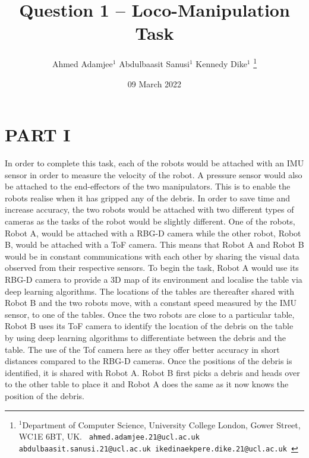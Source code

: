 \documentclass[letterpaper, 10 pt, conference]{ieeeconf}  %
\title{\LARGE \bf
Question 1 – Loco-Manipulation Task
}
\author{Ahmed Adamjee$^{1}$ Abdulbaasit Sanusi$^{1}$ Kennedy Dike$^{1}$ %
\thanks{$^{1}$Department of Computer Science, University College London, Gower Street, WC1E 6BT, UK.
{\tt\small
{{ahmed.adamjee.21}@ucl.ac.uk}
{{abdulbaasit.sanusi.21}@ucl.ac.uk}
{{ikedinaekpere.dike.21}@ucl.ac.uk}
}}}
\date{09 March 2022} %
\begin{document}
\maketitle
\thispagestyle{empty}
\pagestyle{empty}



\section*{PART I}
In order to complete this task, each of the robots would be attached with an IMU sensor in order to measure the velocity of the robot. A pressure sensor would also be attached to the end-effectors of the two manipulators. This is to enable the robots realise when it has gripped any of the debris. In order to save time and increase accuracy, the two robots would be attached with two different types of cameras as the tasks of the robot would be slightly different. One of the robots, Robot A, would be attached with a RBG-D camera while the other robot, Robot B, would be attached with a ToF camera. This means that Robot A and Robot B would be in constant communications with each other by sharing the visual data observed from their respective sensors. 
To begin the task, Robot A would use its RBG-D camera to provide a 3D map of its environment and localise the table via deep learning algorithms. The locations of the tables are thereafter shared with Robot B and the two robots move, with a constant speed measured by the IMU sensor, to one of the tables. Once the two robots are close to a particular table, Robot B uses its ToF camera to identify the location of the debris on the table by using deep learning algorithms to differentiate between the debris and the table. The use of the Tof camera here as they offer better accuracy in short distances compared to the RBG-D cameras. Once the positions of the debris is identified, it is shared with Robot A. Robot B first picks a debris and heads over to the other table to place it and Robot A does the same as it now knows the position of the debris.
\end{document}
